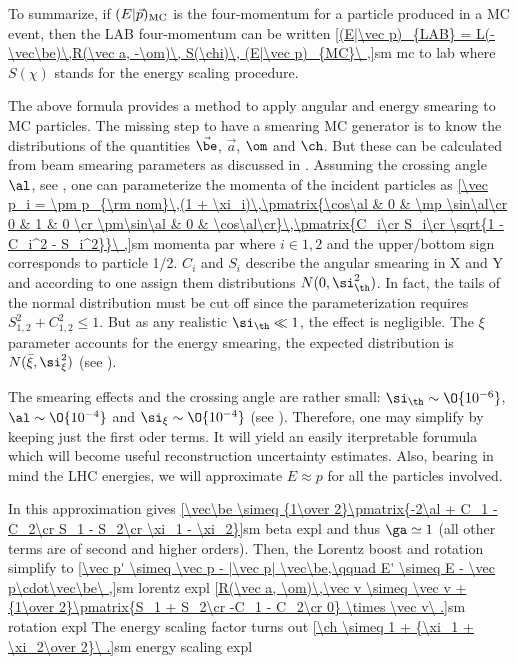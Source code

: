 To summarize, if $(E|\vec p)_{\rm MC}$ is the four-momentum for a particle produced in a MC event, then the LAB four-momentum can be written
\eqref{(E|\vec p)_{LAB} = L(-\vec\be)\,R(\vec a, -\om)\, S(\chi)\, (E|\vec p)_{MC}\ ,}{sm mc to lab}
where $S(\chi)$ stands for the energy scaling procedure.



The above formula provides a method to apply angular and energy smearing to MC particles. The missing step to have a smearing MC generator is to know the distributions of the quantities $\vec\be$, $\vec a$, $\om$ and $\ch$. But these can be calculated from beam smearing parameters as discussed in . Assuming the crossing angle $\al$, see , one can parameterize the momenta of the incident particles as
\eqref{\vec p_i = \pm p_{\rm nom}\,(1 + \xi_i)\,\pmatrix{\cos\al & 0 & \mp \sin\al\cr 0 & 1 & 0 \cr \pm\sin\al & 0 & \cos\al\cr}\,\pmatrix{C_i\cr S_i\cr \sqrt{1 - C_i^2 - S_i^2}}\ ,}{sm momenta par}
where $i\in {1, 2}$ and the upper/bottom sign corresponds to particle 1/2. $C_i$ and $S_i$ describe the angular smearing in X and Y and according to  one assign them distributions $N(0, \si_\th^2)$. In fact, the tails of the normal distribution must be cut off since the parameterization requires $S_{1,2}^2 + C_{1,2}^2 \leq 1$. But as any realistic $\si_\th \ll 1$, the effect is negligible. The $\xi$ parameter accounts for the energy smearing, the expected distribution is $N(\bar\xi, \si_\xi^2)$ (see ).

The smearing effects and the crossing angle are rather small: $\si_\th \sim \O{10^{-6}}$, $\al \sim \O{10^{-4}}$ and $\si_\xi \sim \O{10^{-4}}$ (see  ). Therefore, one may simplify  by keeping just the first oder terms. It will yield an easily iterpretable forumula which will become useful reconstruction uncertainty estimates. Also, bearing in mind the LHC energies, we will approximate $E\approx p$ for all the particles involved.

In this approximation  gives
\eqref{\vec\be \simeq {1\over 2}\pmatrix{-2\al + C_1 - C_2\cr S_1 - S_2\cr \xi_1 - \xi_2}}{sm beta expl}
and thus $\ga\simeq 1$ (all other terms are of second and higher orders). Then, the Lorentz boost  and rotation  simplify to
\eqref{\vec p' \simeq \vec p - |\vec p| \vec\be,\qquad E' \simeq E - \vec p\cdot\vec\be\ ,}{sm lorentz expl}
\eqref{R(\vec a, \om)\,\vec v \simeq \vec v + {1\over 2}\pmatrix{S_1 + S_2\cr -C_1 - C_2\cr 0} \times \vec v\ .}{sm rotation expl}
The energy scaling factor turns out
\eqref{\ch \simeq 1 + {\xi_1 + \xi_2\over 2}\ .}{sm energy scaling expl}

